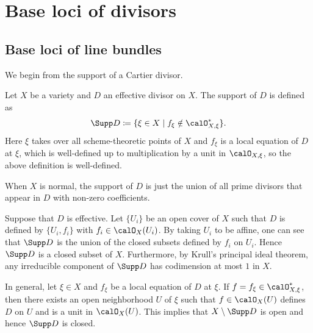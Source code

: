 \section{Base loci of divisors}




\subsection{Base loci of line bundles}


  We begin from the support of a Cartier divisor.

  \begin{definition}
    Let $X$ be a variety and $D$ an effective divisor on $X$.
    The support of $D$ is defined as 
    \[ \Supp D \coloneqq \{ \xi \in X \mid f_\xi \notin \calO_{X,\xi}^* \}. \]
    Here $\xi$ takes over all scheme-theoretic points of $X$ and $f_\xi$ is a local equation of $D$ at $\xi$, which is well-defined up to multiplication by a unit in $\calO_{X,\xi}$, so the above definition is well-defined.
  \end{definition}

  When $X$ is normal, the support of $D$ is just the union of all prime divisors that appear in $D$ with non-zero coefficients.

  Suppose that $D$ is effective.
  Let $\{U_i\}$ be an open cover of $X$ such that $D$ is defined by $\{U_i, f_i\}$ with $f_i \in \calO_X(U_i)$.
  By taking $U_i$ to be affine, one can see that $\Supp D$ is the union of the closed subsets defined by $f_i$ on $U_i$.
  Hence $\Supp D$ is a closed subset of $X$.
  Furthermore, by Krull's principal ideal theorem, any irreducible component of $\Supp D$ has codimension at most $1$ in $X$.

  In general, let $\xi \in X$ and $f_\xi$ be a local equation of $D$ at $\xi$.
  If $f = f_\xi \in \calO_{X,\xi}^*$, then there exists an open neighborhood $U$ of $\xi$ such that $f \in \calO_X(U)$ defines $D$ on $U$ and is a unit in $\calO_X(U)$.
  This implies that $X \setminus \Supp D$ is open and hence $\Supp D$ is closed.
  
